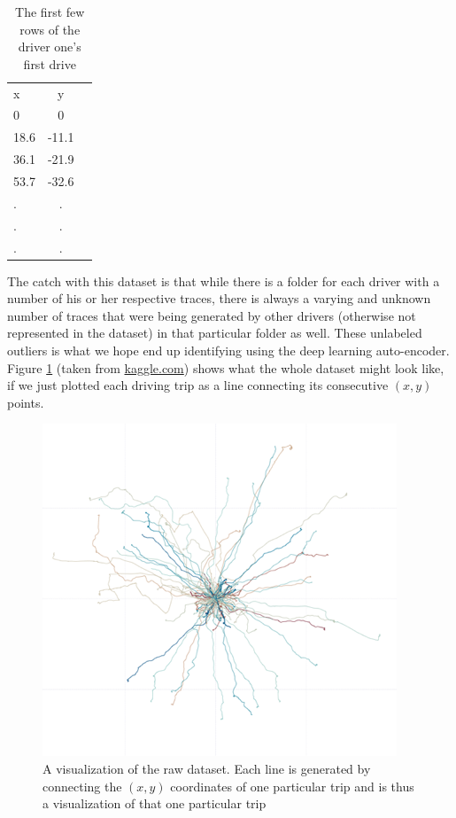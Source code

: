 \documentclass{vldb}
\begin{document}
\begin{table}
\centering
\begin{tabular}{l c r}
x & y\\
0 & 0\\
18.6 & -11.1 \\
36.1 & -21.9 \\
53.7 & -32.6 \\
. & .  \\
. & . \\
. & . \\	
\end{tabular}
\caption{The first few rows of the driver one's first drive}
\label{table:raw-trace}
\end{table}


The catch with this dataset is that while there is a folder for each driver with a number of his or her respective traces, there is always a varying and unknown number of traces that were being generated by other drivers (otherwise not represented in the dataset) in that particular folder as well. These unlabeled outliers is what we hope end up identifying using the deep learning auto-encoder. \\
Figure \ref{fig:axa-trip} (taken from \href{https://www.kaggle.com/c/axa-driver-telematics-analysis/data}{kaggle.com}) shows what the whole dataset might look like, if we just plotted each driving trip as a line connecting its consecutive $(x, y)$ points.
\begin{figure}
\centering
\includegraphics[width=\linewidth]{"pics/axa-trip"}
\caption{A visualization of the raw dataset. Each line is generated by connecting the $(x,y)$ coordinates of one particular trip and is thus a visualization of that one particular trip}
\label{fig:axa-trip}
\end{figure}
\end{document}
